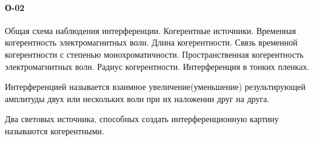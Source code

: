 \documentclass[__main__.tex]{subfiles}
\begin{document}
\paragraph{О-02}
Общая схема наблюдения интерференции. Когерентные источники. Временная когерентность электромагнитных волн. Длина когерентности. Связь временной когерентности с степенью монохроматичности. Пространственная когерентность электромагнитных волн. Радиус когерентности. Интерференция в тонких пленках.\\

\begin{definition}
Интерференцией называется взаимное увеличение(уменьшение) результирующей амплитуды двух или нескольких волн при их наложении друг на друга.
\end{definition}

\begin{definition}
Два световых источника, способных создать интерференционную картину называются когерентными.
\end{definition}
\end{document}
